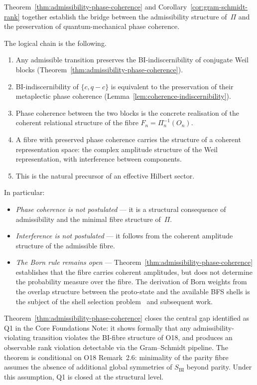   Theorem~\ref{thm:admissibility-phase-coherence} and
  Corollary~\ref{cor:gram-schmidt-rank} together establish the bridge between
  the admissibility structure of~$\Pi$ and the preservation of quantum-mechanical
  phase coherence.

  The logical chain is the following.

  \begin{enumerate}
    \item Any admissible transition preserves the BI-indiscernibility of conjugate
    Weil blocks (Theorem~\ref{thm:admissibility-phase-coherence}).
    \item BI-indiscernibility of $\{c, q-c\}$ is equivalent to the preservation
    of their metaplectic phase coherence (Lemma~\ref{lem:coherence-indiscernibility}).
    \item Phase coherence between the two blocks is the concrete realisation of
    the coherent relational structure of the fibre $F_n = \Pi_n^{-1}(O_n)$.
    \item A fibre with preserved phase coherence carries the structure of a coherent
    representation space: the complex amplitude structure of the Weil
    representation, with interference between components.
    \item This is the natural precursor of an effective Hilbert sector.
  \end{enumerate}

  In particular:

  \begin{itemize}
    \item \emph{Phase coherence is not postulated} — it is a structural
    consequence of admissibility and the minimal fibre structure of~$\Pi$.
    \item \emph{Interference is not postulated} — it follows from the coherent
    amplitude structure of the admissible fibre.
    \item \emph{The Born rule remains open} — Theorem~\ref{thm:admissibility-phase-coherence}
    establishes that the fibre carries coherent amplitudes, but does not determine
    the probability measure over the fibre.
    The derivation of Born weights from the overlap structure between the
    proto-state and the available BFS shells is the subject of the
    shell selection problem~\cite{O23} and subsequent work.
  \end{itemize}

  \begin{remark}[Status of Q1]
    \label{rem:q1-status}
    Theorem~\ref{thm:admissibility-phase-coherence} closes the central gap
    identified as Q1 in the Core Foundations Note: it shows formally that
    any admissibility-violating transition violates the BI-fibre structure
    of O18, and produces an observable rank violation detectable via the
    Gram--Schmidt pipeline.
    The theorem is conditional on O18 Remark~2.6: minimality of the parity
    fibre assumes the absence of additional global symmetries of
    $S_{\mathrm{BI}}$ beyond parity.
    Under this assumption, Q1 is closed at the structural level.
  \end{remark}

